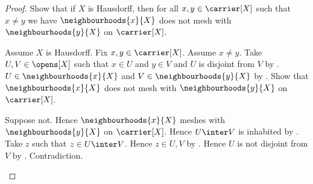 \begin{proof}
    Show that if $X$ is Hausdorff, then for all
        $x,y\in\carrier[X]$ such that $x\neq y$ we have
        $\neighbourhoods{x}{X}$ does not mesh with
        $\neighbourhoods{y}{X}$ on $\carrier[X]$.
    \begin{subproof}
        Assume $X$ is Hausdorff.
        Fix $x,y\in\carrier[X]$.
        Assume $x\neq y$.
        Take $U,V\in\opens[X]$ such that $x\in U$ and $y\in V$ and
            $U$ is disjoint from $V$ by .
        $U\in\neighbourhoods{x}{X}$ and
            $V\in\neighbourhoods{y}{X}$ by
            .
        Show that $\neighbourhoods{x}{X}$ does not mesh with
            $\neighbourhoods{y}{X}$ on $\carrier[X]$.
        \begin{subproof}
            Suppose not.
            Hence $\neighbourhoods{x}{X}$ meshes with
                $\neighbourhoods{y}{X}$ on $\carrier[X]$.
            Hence $U\inter V$ is inhabited by .
            Take $z$ such that $z\in U\inter V$.
            Hence $z\in U,V$ by .
            Hence $U$ is not disjoint from $V$ by .
            Contradiction.
        \end{subproof}
    \end{subproof}


\end{proof}
